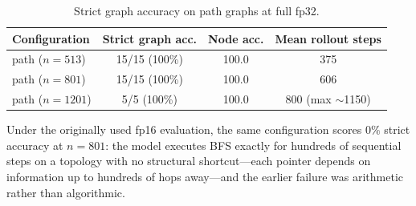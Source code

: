 \documentclass{article}
\begin{document}
\begin{table}[H]
  \caption{Strict graph accuracy on path graphs at full fp32.}
  \label{path-table}
  \centering
  \begin{tabular}{lccc}
    \toprule
    Configuration & Strict graph acc. & Node acc. & Mean rollout steps \\
    \midrule
    path ($n{=}513$)  & 15/15 (100\%) & 100.0 & 375 \\
    path ($n{=}801$)  & 15/15 (100\%) & 100.0 & 606 \\
    path ($n{=}1201$) & 5/5 (100\%)   & 100.0 & 800 (max $\sim$1150) \\
    \bottomrule
  \end{tabular}
\end{table}

Under the originally used fp16 evaluation, the same configuration scores $0\%$ strict
accuracy at $n{=}801$: the model executes BFS exactly for hundreds of sequential steps on
a topology with no structural shortcut---each pointer depends on information up to
hundreds of hops away---and the earlier failure was arithmetic rather than algorithmic.
\end{document}
